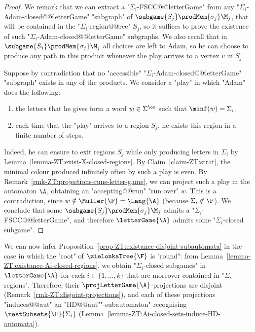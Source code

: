 \documentclass[10pt,a4paper]{amsart}
\renewcommand{\ss}{\sigma}
\renewcommand{\SS}{\Sigma}
\begin{document}
\begin{proof}
	We remark that we can extract a "$\SS_i$-FSCC@@letterGame"  from any "$\SS_i$-Adam-closed@@letterGame" "subgraph" of $\subgame{S_j} \prodMem{\ss_j} \M_j$, that will be contained in the "$\SS_i$-region@@rec" $S_j$, so it suffices to prove the existence of such "$\SS_i$-Adam-closed@@letterGame" subgraphs. We also recall that in $\subgame{S_j} \prodMem{\ss_j} \M_j$ all choices are left to Adam, so he can choose to produce any path in this product whenever the play arrives to a vertex $v$ in $S_j$.
	
	Suppose by contradiction that no "accessible" "$\SS_i$-Adam-closed@@letterGame" "subgraph" exists in any of the products. We consider a "play" in which "Adam" does the following:
	\begin{enumerate}[label=(\alph*)]%
		\item the letters that he gives form a word $w\in\SS^\oo$ such that $\minf(w) = \SS_i$, \label{item:letter-inf-often}
		\item each time that the "play" arrives to a region $S_j$, he exists this region in a finite number of steps.\label{item:Adam-exists-regions}
	\end{enumerate}
	Indeed, he can ensure to exit regions $S_j$ while only producing letters in $\SS_i$ by Lemma~\ref{lemma-ZT:exist-X-closed-regions}. By Claim~\ref{claim-ZT:strat}, the minimal colour produced infinitely often by such a play is even.
	By Remark~\ref{rmk-ZT:projections-runs-letter-game}, we can project such a play in the automaton $\A$, obtaining an "accepting@@run" "run over" $w$. This is a contradiction, since $w\notin \Muller{\F} = \Lang{\A}$ (because $\SS_i\notin \F$).
	We conclude that some $\subgame{S_j} \prodMem{\ss_j} \M_j$ admits a "$\SS_i$-FSCC@@letterGame", and therefore  $\letterGame{\A}$ admits some "$\SS_i$-closed subgame".	  
\end{proof}



We can now infer Proposition~\ref{prop-ZT:existance-disjoint-subautomata} in the case in which the "root" of $\zielonkaTree{\F}$ is "round": from Lemma~\ref{lemma-ZT:existance-Ai-closed-regions}, we obtain "$\SS_i$-closed subgames" in $\letterGame{\A}$ for each $i\in\{1,\dots, k\}$ that are moreover contained in "$\SS_i$-regions". Therefore, their $\projLetterGame{\A}$-projections are disjoint (Remark~\ref{rmk-ZT:disjoint-projections}), and each of these projections "induces@@aut" an "HD@@aut""-subautomaton" recognising $\restSubsets{\F}{\SS_i}$ (Lemma~\ref{lemma-ZT:Ai-closed-sets-induce-HD-automata}).
\end{document}

